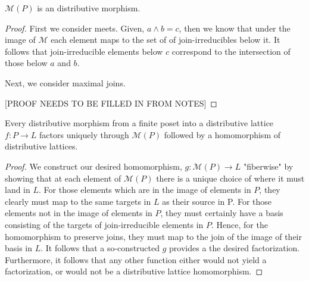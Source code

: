 \documentclass[hoptionsi,review,format=sigplan]{acmart}
\theoremstyle{definition}
\newcommand{\Mcc}{\mathcal{M}}
\begin{document}
\begin{lemma}
\(\Mcc(P)\) is an distributive morphism.
\end{lemma}
\begin{proof}

First we consider meets. Given, \(a \wedge b = c\), then we know that under the image of \(\Mcc\) each element maps to the set of of join-irreducibles below it. It follows that join-irreducible elements below \(c\) correspond to the intersection of those below \(a\) and \(b\).

Next, we consider maximal joins.

[PROOF NEEDS TO BE FILLED IN FROM NOTES]

\end{proof}




\begin{lemma}
Every distributive morphism from a finite poset into a distributive lattice \(f : P \rightarrow L\) factors uniquely through \(\Mcc(P)\) followed by a homomorphism of distributive lattices.
\end{lemma}

\begin{proof}
We construct our desired homomorphism, \(g : \Mcc(P) \rightarrow L\) "fiberwise" by showing that at each element of \(\Mcc(P)\) there is a unique choice of where it must land in \(L\). For those elements which are in the image of elements in \(P\), they clearly must map to the same targets in \(L\) as their source in P. For those elements not in the image of elements in \(P\), they must certainly have a basis consisting of the targets of join-irreducible elements in \(P\). Hence, for the homomorphism to preserve joins, they must map to the join of the image of their basis in \(L\). It follows that a so-constructed \(g\) provides a the desired factorization. Furthermore, it follows that any other function either would not yield a factorization, or would not be a distributive lattice homomorphism.
\end{proof}
\end{document}
